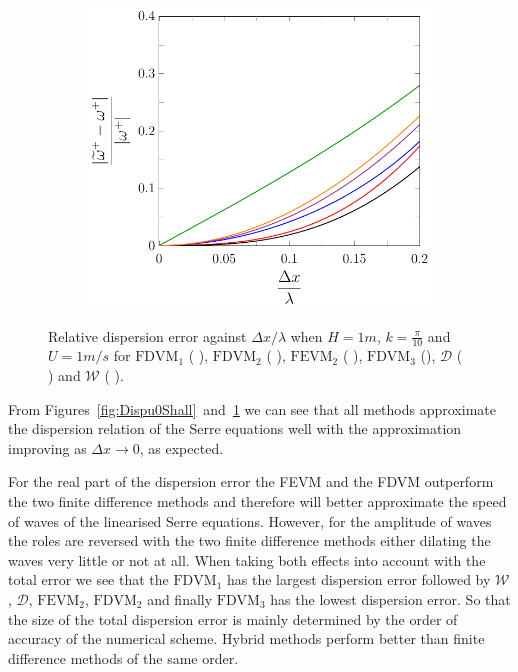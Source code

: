 \begin{figure}
\begin{subfigure}{0.5\textwidth}
	\end{subfigure}
	\par\bigskip
	\begin{subfigure}{0.5\textwidth}
		\includegraphics[width=\textwidth]{./chp4/figures/New/Dispu1Shall.pdf}
	\end{subfigure}
	\caption{Relative dispersion error against $\Delta x / \lambda$ when $H = 1m$, $k = \frac{\pi}{10}$ and $U = 1 m/s$ for $\text{FDVM}_1$ ({\color{green!60!black} \solidrule}), $\text{FDVM}_2$ ({\color{red} \solidrule}), $\text{FEVM}_2$ ({\color{blue} \solidrule}), $\text{FDVM}_3$ ({\solidrule}), $\mathcal{D}$ ({\color{violet!80!white} \solidrule}) and $\mathcal{W}$ ({\color{orange} \solidrule}).}
	\label{fig:Dispu1Shall}
\end{figure}

From Figures~\ref{fig:Dispu0Shall}~and~\ref{fig:Dispu1Shall} we can see that all methods approximate the dispersion relation of the Serre equations well with the approximation improving as $\Delta x \rightarrow 0$, as expected.

For the real part of the dispersion error the FEVM and the FDVM outperform the two finite difference methods and therefore will better approximate the speed of waves of the linearised Serre equations.  However, for the amplitude of waves the roles are reversed with the two finite difference methods either dilating the waves very little or not at all. When taking both effects into account with the total error we see that the $\text{FDVM}_1$ has the largest dispersion error followed by $\mathcal{W}$, $\mathcal{D}$, $\text{FEVM}_2$, $\text{FDVM}_2$ and finally $\text{FDVM}_3$ has the lowest dispersion error. So that the size of the total dispersion error is mainly determined by the order of accuracy of the numerical scheme. Hybrid methods perform better than finite difference methods of the same order. 

